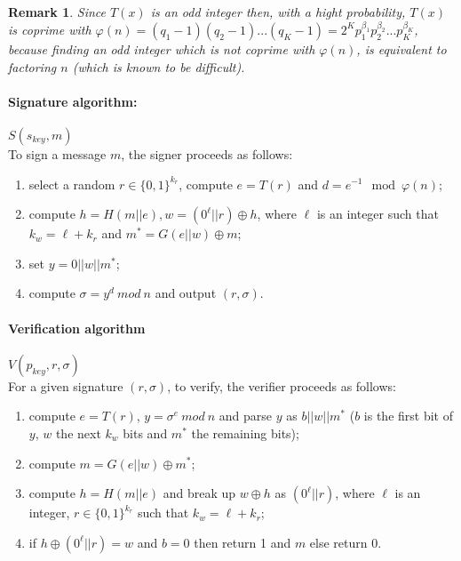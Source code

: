 \documentclass[a4paper,11pt]{article}
\newtheorem{remark}[theorem]{Remark}
\begin{document}
\begin{remark}
Since $T(x)$ is an odd integer then, with a hight probability, $T(x)$ is coprime with $\varphi(n)=(q_1-1)(q_2-1)...(q_K-1)=2^Kp^{\beta_{1}}_{1}p^{\beta_{2}}_{2}...p^{\beta_{K}}_{K}$, because finding an odd integer which is not coprime with $\varphi(n)$, is equivalent to factoring $n$ (which is known to be difficult).
\end{remark}

\paragraph{Signature algorithm:}  $S(s_{key},  m)$\\
To sign a message $m$, the signer proceeds as follows:
\begin{enumerate}
\item select a random $r\in\{0,1\}^{k_r}$, compute $e=T(r)$ and $d=e^{-1} \mod \varphi(n)$;
\item compute $h=H(m||e), w=(0^{\ell}||r)\oplus h$, where $\ell$ is an integer such that $k_w=\ell +k_r$ and $m^*=G(e||w)\oplus m$;
\item set $y= 0||w||m^*$;
\item compute $\sigma = y^d \ mod \ n $ and output $(r,\sigma)$.
\end{enumerate}

\paragraph{Verification algorithm}  $V(p_{key},r,\sigma)$\\
For a given signature $(r,\sigma)$, to verify, the verifier proceeds as follows:  
\begin{enumerate}
\item compute $e=T(r)$, $y= \sigma^e \ mod \ n$ and parse $y$ as $b||w||m^*$ ($b$ is the first bit of $y$,  $w$ the next $k_w$ bits and $m^*$ the remaining bits);
\item compute $m= G(e||w)\oplus m^*$;
\item compute $h=H(m||e)$ and  break up $w\oplus h$ as $(0^\ell||r)$, where $\ell$ is an integer, $r\in\{0,1\}^{k_r}$ such that $k_w=\ell+k_r$;
\item if $h\oplus (0^{\ell}||r)=w$ and $b=0$ then return 1 and $m$
else return 0.
\end{enumerate}


\end{document}
